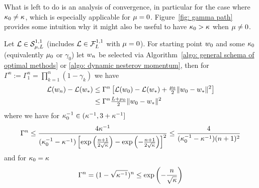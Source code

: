 What is left to do is an analysis of convergence, in particular for the case
where \(\kappa_0\neq\kappa\), which is especially applicable for \(\mu=0\).
Figure~\ref{fig: gamma path} provides some intuition why it might also be
useful to have \(\kappa_0>\kappa\) when \(\mu\neq0\).

\begin{theorem}\label{thm: nesterov momentum convergence rates}
	Let \(\mathcal{L} \in \mathcal{S}^{1,1}_{{\mu},{L}}\) (includes
	\(\mathcal{L}\in\mathcal{F}^{1,1}_{L}\) with \(\mu=0\)). For starting point
	\(w_0\) and some \(\kappa_0\) (equivalently \(\mu_0\) or
	\(\gamma_0\)) let \(w_n\) be selected via Algorithm~\ref{algo: general schema of optimal methods}
	or \ref{algo: dynamic nesterov momentum}, then for \(\Gamma^n := \Gamma_1^n =
	\prod_{k=1}^n(1-\gamma_k)\) we have
	\begin{align*}
		\mathcal{L}(w_n) - \mathcal{L}(w_*)
		&\le \Gamma^n\left[
			\mathcal{L}(w_0) -\mathcal{L}(w_*)
			+ \tfrac{\mu_0}2\|w_0-w_*\|^2
		\right] \\
		&\le \Gamma^n \tfrac{L + \mu_0}{2}\|w_0-w_*\|^2
	\end{align*}
	where we have for \(\kappa_0^{-1}\in (\kappa^{-1}, 3 + \kappa^{-1}]\)
	\begin{align*}
		\Gamma^n
		\le \frac{4\kappa^{-1}}{(\kappa_0^{-1}-\kappa^{-1})\left[
			\exp\left(\frac{n+1}{2\sqrt{\kappa}}\right)
			-\exp\left(-\frac{n+1}{2\sqrt{\kappa}}\right)
		\right]^2}
		\le \frac{4}{(\kappa_0^{-1}-\kappa^{-1})(n+1)^2}
	\end{align*}
	and for \(\kappa_0 = \kappa\)
	\begin{align*}
		\Gamma^n = (1-\sqrt{\kappa^{-1}})^n
		\le \exp\left(-\frac{n}{\sqrt{\kappa}}\right)
	\end{align*}
\end{theorem}
